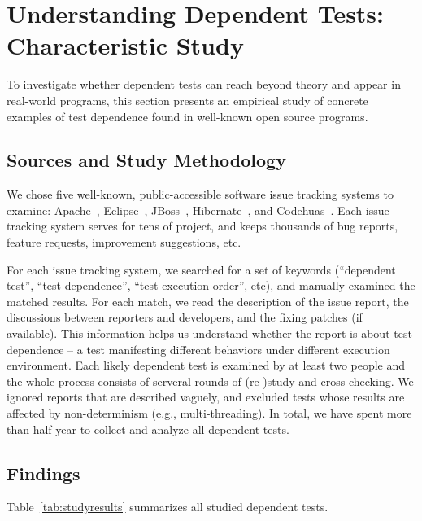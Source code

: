 \section{Understanding Dependent Tests: Characteristic Study}
\label{sec:study}

To investigate whether dependent tests can reach beyond theory
and appear in real-world programs, this section presents an empirical
study of concrete examples of test dependence found in
well-known open source programs. 


\subsection{Sources and Study Methodology}

We chose five well-known, public-accessible software issue
tracking systems to examine: Apache~\cite{apachebug},
Eclipse~\cite{eclipsebug}, JBoss~\cite{jbossbug},
Hibernate~\cite{hibernatebug}, and Codehuas~\cite{codehuasbug}.
Each issue tracking system serves for tens of project, and
keeps thousands of bug reports, feature requests, improvement
suggestions, etc.

For each issue tracking system, we searched for a set of keywords
(``dependent test'', ``test dependence'', ``test execution order'',
etc), and manually examined the matched results. For each match, we read the
description of the issue report, the discussions between reporters
and developers, and the fixing patches (if available). This information
helps us understand whether the report is about test dependence
-- a test manifesting different behaviors under different execution
environment. Each likely dependent test is examined by
at least two people and the whole process consists of serveral
rounds of (re-)study and cross checking. We ignored reports
that are described vaguely, and excluded tests whose results are
affected by non-determinism (e.g., multi-threading).
In total, we have spent more than half year to collect and analyze all dependent
tests. 


\subsection{Findings}



Table~\ref{tab:studyresults} summarizes all studied dependent tests.


